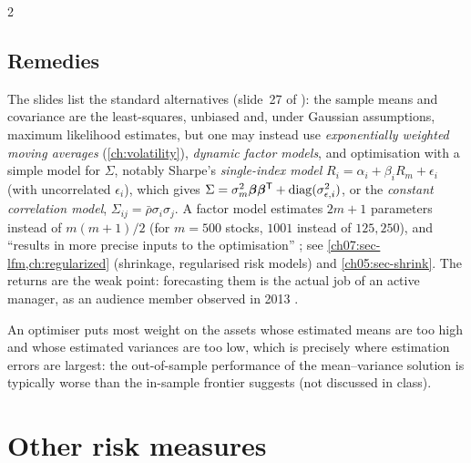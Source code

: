 \begin{paracol}{2}
\subsection{Remedies}
The slides list the standard alternatives  (slide~27 of ): the sample means and
covariance are the least-squares, unbiased and, under Gaussian assumptions, maximum likelihood estimates, but
one may instead use \emph{exponentially weighted moving averages} (\cref{ch:volatility}), \emph{dynamic factor
models}, and optimisation with a simple model for $\Sigma$, notably Sharpe's \emph{single-index model}
$R_i=\alpha_i+\beta_iR_m+\epsilon_i$ (with uncorrelated $\epsilon_i$), which gives $\Sigma=\sigma_m^2\bm\beta\bm\beta^{\mathsf T}+
\operatorname{diag}(\sigma^2_{\epsilon,i})$, or the \emph{constant correlation model}, $\Sigma_{ij}=\bar\rho\sigma_i\sigma_j$. A factor model
estimates $2m+1$ parameters instead of $m(m+1)/2$ (for $m=500$ stocks, $1001$ instead of $125{,}250$), and ``results in
more precise inputs to the optimisation'' ; see \cref{ch07:sec-lfm,ch:regularized} (shrinkage,
regularised risk models) and \cref{ch05:sec-shrink}. The returns are the weak point: forecasting them is the actual
job of an active manager, as an audience member observed in 2013 .

\begin{finance}
An optimiser puts most weight on the assets whose estimated means are too high and whose estimated variances are too
low, which is precisely where estimation errors are largest: the out-of-sample performance of the
mean--variance solution is typically worse than the in-sample frontier suggests (not discussed in class).
\end{finance}

\section{Other risk measures}\label{ch10:sec-risk}


\end{paracol}
